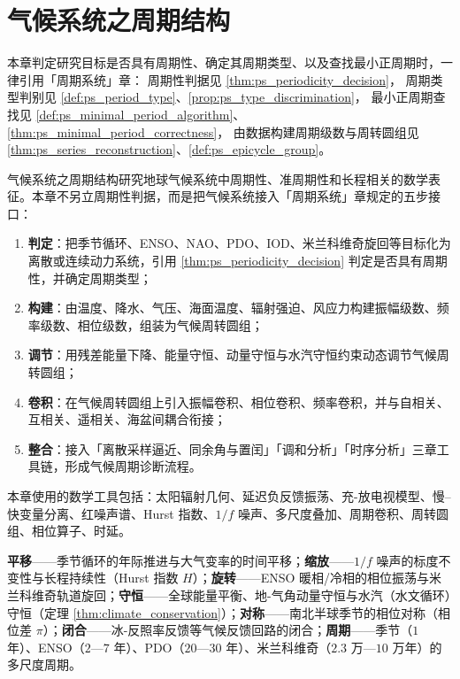 \chapter{气候系统之周期结构}

\begin{remark}[本章目标的周期性判定（引用）]\label{rem:climate_ps_hook}
本章判定研究目标是否具有周期性、确定其周期类型、以及查找最小正周期时，一律引用「周期系统」章：
周期性判据见 \cref{thm:ps_periodicity_decision}，
周期类型判别见 \cref{def:ps_period_type}、\cref{prop:ps_type_discrimination}，
最小正周期查找见 \cref{def:ps_minimal_period_algorithm}、\cref{thm:ps_minimal_period_correctness}，
由数据构建周期级数与周转圆组见 \cref{thm:ps_series_reconstruction}、\cref{def:ps_epicycle_group}。
\end{remark}

\begin{remark}\label{rem:climate_five_steps_positioning}
气候系统之周期结构研究地球气候系统中周期性、准周期性和长程相关的数学表征。本章不另立周期性判据，而是把气候系统接入「周期系统」章规定的五步接口：
\begin{enumerate}[label=(\arabic*)]
    \item \textbf{判定}：把季节循环、ENSO、NAO、PDO、IOD、米兰科维奇旋回等目标化为离散或连续动力系统，引用 \cref{thm:ps_periodicity_decision} 判定是否具有周期性，并确定周期类型；
    \item \textbf{构建}：由温度、降水、气压、海面温度、辐射强迫、风应力构建振幅级数、频率级数、相位级数，组装为气候周转圆组；
    \item \textbf{调节}：用残差能量下降、能量守恒、动量守恒与水汽守恒约束动态调节气候周转圆组；
    \item \textbf{卷积}：在气候周转圆组上引入振幅卷积、相位卷积、频率卷积，并与自相关、互相关、遥相关、海盆间耦合衔接；
    \item \textbf{整合}：接入「离散采样逼近、同余角与置闰」「调和分析」「时序分析」三章工具链，形成气候周期诊断流程。
\end{enumerate}
本章使用的数学工具包括：太阳辐射几何、延迟负反馈振荡、充-放电视模型、慢–快变量分离、红噪声谱、Hurst 指数、$1/f$ 噪声、多尺度叠加、周期卷积、周转圆组、相位算子、时延。
\end{remark}

\begin{remark}[本章七主题导引]\label{rem:climate_seven_themes}
\textbf{平移}——季节循环的年际推进与大气变率的时间平移；\textbf{缩放}——$1/f$ 噪声的标度不变性与长程持续性（Hurst 指数 $H$）；\textbf{旋转}——ENSO 暖相/冷相的相位振荡与米兰科维奇轨道旋回；\textbf{守恒}——全球能量平衡、地-气角动量守恒与水汽（水文循环）守恒（定理 \ref{thm:climate_conservation}）；\textbf{对称}——南北半球季节的相位对称（相位差 $\pi$）；\textbf{闭合}——冰-反照率反馈等气候反馈回路的闭合；\textbf{周期}——季节（$1$ 年）、ENSO（$2$—$7$ 年）、PDO（$20$—$30$ 年）、米兰科维奇（$2.3$ 万—$10$ 万年）的多尺度周期。
\end{remark}

